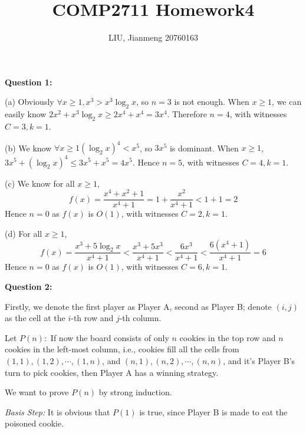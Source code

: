 \documentclass[a4paper,11pt]{article}
\title{\textbf{COMP2711} Homework4}
\author{LIU, Jianmeng 20760163}
\date{}
\begin{document}
    \maketitle

    \begin{spacing}{1.4}

    \setlength{\parindent}{0em}

    \textbf{Question 1:}

    (a) Obviously $\forall x \ge 1, x^3>x^3\log_2 x$, so $n=3$ is not enough.
    When $x\ge 1$, we can easily know $2x^2+x^3\log_2 x \ge 2x^4+x^4=3x^4$.
    Therefore $n=4$, with witnesses $C=3, k=1$.

    \vspace{5pt}

    (b) We know $\forall x \ge 1(\log_2 x)^4<x^5$, so $3x^5$ is dominant.
    When $x\ge 1$, $3x^5+(\log_2 x)^4\le 3x^5+x^5=4x^5$. Hence $n=5$,
    with witnesses $C=4, k=1$.

    \vspace{5pt}

    (c) We know for all $x\ge 1$,
    $$f(x)=\frac{x^4+x^2+1}{x^4+1}=1+\frac{x^2}{x^4+1}<1+1=2$$
    Hence $n=0$ as $f(x)$ is $O(1)$, with witnesses $C=2, k=1$.

    \vspace{5pt}

    (d) For all $x\ge 1$, 
    $$f(x)=\frac{x^3+5\log_2 x}{x^4+1}<\frac{x^3+5x^3}{x^4+1}
    <\frac{6x^3}{x^4+1}<\frac{6(x^4+1)}{x^4+1}=6$$
    Hence $n=0$ as $f(x)$ is $O(1)$, with witnesses $C=6, k=1$.

    \vspace{20pt}

    \textbf{Question 2:}

    \setlength{\parindent}{2em}

    Firstly, we denote the first player as Player A, second as
    Player B; denote $(i, j)$ as the cell at the $i$-th
    row and $j$-th column.

    Let $P(n):$ If now the board consists of 
    only $n$ cookies in the top row
    and $n$ cookies in the left-most column, i.e., cookies fill
    all the cells from $(1, 1), (1, 2), \cdots ,(1, n)$, and 
    $(n, 1), (n, 2), \cdots ,(n, n)$, and it's Player B's turn
    to pick cookies, then Player A has a winning strategy.

    We want to prove $P(n)$ by strong induction.

    \textit{Basis Step:} It is obvious that $P(1)$ is true, 
    since Player B is made to eat the poisoned cookie.
    

\end{spacing}
\end{document}
